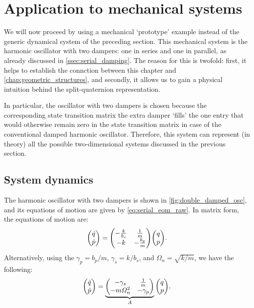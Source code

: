 \section{Application to mechanical systems}
\label{sec:mechanical}
We will now proceed by using a mechanical `prototype' example instead of the generic dynamical system of the preceding section. This mechanical system is the harmonic oscillator with two dampers: one in series and one in parallel, as already discussed in \cref{ssec:serial_damping}. The reason for this is twofold: first, it helps to establish the connction between this chapter and \cref{chap:geometric_structures}, and secondly, it allows us to gain a physical intuition behind the split-quaternion representation. 

In particular, the oscillator with two dampers is chosen because the corresponding state transition matrix the extra damper `fills' the one entry that would otherwise remain zero in the state transition matrix in case of the conventional damped harmonic oscillator. Therefore, this system can represent (in theory) all the possible two-dimensional systems discussed in the previous section.

\subsection{System dynamics}
The harmonic oscillator with two dampers is shown in \cref{fig:double_damped_osc}, and its equations of motion are given by \cref{eq:serial_eom_raw}. In matrix form, the equations of motion are:
\begin{equation*}
    \mqty(\dot{q}\\\dot{p}) = \mqty(-\tfrac{k}{b_s} & \tfrac{1}{m} \\ -k & - \tfrac{b_p}{m})\mqty(q \\ p).
\end{equation*}
Alternatively, using the $\gamma_p = b_p/m$, $\gamma_s = k/b_s$, and $\Omega_n = \sqrt{k/m}$, we have the following:
\begin{equation}
    \mqty(\dot{q}\\\dot{p}) = \underbrace{\mqty(-\gamma_s & \frac{1}{m} \\ -m\Omega_n^2 & - \gamma_p)}_A \mqty(q \\ p).
    \label{eq:ddho_eom}
\end{equation}

